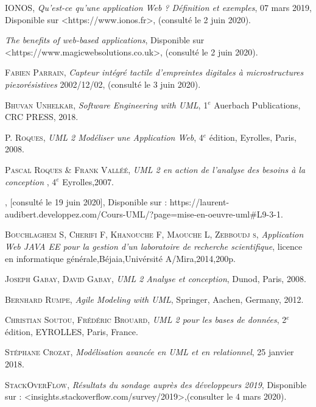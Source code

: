 \begin{thebibliography}{2}
		 \textsc{IONOS}, \emph{Qu’est-ce qu’une application Web ? Définition et exemples}, 07 mars 2019, Disponible sur <https://www.ionos.fr>, (consulté le 2 juin 2020). 
		
		
          \emph{The benefits of web-based applications}, Disponible sur  <https://www.magicwebsolutions.co.uk>, (consulté le 2 juin 2020).
        
         \textsc{Fabien Parrain},  \emph{Capteur intégré tactile d'empreintes digitales à microstructures piezorésistives 
        } 2002/12/02, (consulté le 3 juin 2020).
        
          \textsc{Bhuvan Unhelkar}, \emph{Software Engineering with UML}, 1$^e$ Auerbach Publications, CRC PRESS, 2018.
        
         P. \textsc{Roques}, \emph{UML 2 Modéliser une Application Web}, 4$^e$ édition, Eyrolles, Paris, 2008.
        
          \textsc{Pascal Roques & Frank Valléé}, \emph{UML 2 en action de l'analyse des besoins à la conception }, 4$^e$ Eyrolles,2007.
        
          \emph{}, [consulté le 19 juin 2020], Disponible sur : https://laurent-audibert.developpez.com/Cours-UML/?page=mise-en-oeuvre-uml#L9-3-1.
        
          \textsc{Bouchlaghem S, Cherifi F, Khanouche F, Maouche L, Zebboudj s}, \emph{Application Web JAVA EE pour la gestion d'un laboratoire de recherche scientifique}, licence en informatique générale,Béjaia,Univérsité A/Mira,2014,200p.
        
         \textsc{Joseph Gabay}, \textsc{David Gabay}, \emph{UML 2 Analyse et conception},  Dunod, Paris, 2008.
        
         \textsc{Bernhard Rumpe}, \emph{Agile Modeling with UML},  Springer, Aachen, Germany, 2012.
        
         \textsc{Christian Soutou}, \textsc{Frédéric Brouard}, \emph{UML 2 pour les bases de données}, 2$^e$ édition,  EYROLLES, Paris, France.

         \textsc{Stéphane Crozat}, \emph{Modélisation avancée en UML et en relationnel},  25 janvier 2018.   
        
         \textsc{StackOverFlow}, \emph{Résultats du sondage auprès des développeurs 2019}, Disponible sur : <insights.stackoverflow.com/survey/2019>,(consulter le 4 mars 2020). 


\end{thebibliography}

